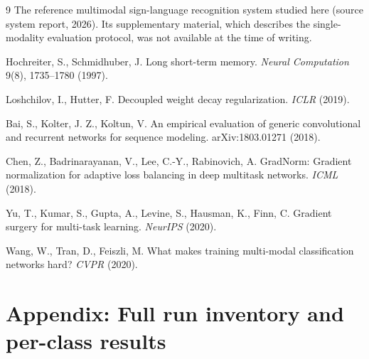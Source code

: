 \documentclass[11pt,a4paper]{article}
\begin{document}
\begin{thebibliography}{9}
\small
{} The reference multimodal sign-language recognition system studied here (source system report, 2026). Its supplementary material, which describes the single-modality evaluation protocol, was not available at the time of writing.

 Hochreiter, S., Schmidhuber, J. Long short-term memory. \emph{Neural Computation} 9(8), 1735--1780 (1997).

 Loshchilov, I., Hutter, F. Decoupled weight decay regularization. \emph{ICLR} (2019).

 Bai, S., Kolter, J. Z., Koltun, V. An empirical evaluation of generic convolutional and recurrent networks for sequence modeling. arXiv:1803.01271 (2018).

 Chen, Z., Badrinarayanan, V., Lee, C.-Y., Rabinovich, A. GradNorm: Gradient normalization for adaptive loss balancing in deep multitask networks. \emph{ICML} (2018).

 Yu, T., Kumar, S., Gupta, A., Levine, S., Hausman, K., Finn, C. Gradient surgery for multi-task learning. \emph{NeurIPS} (2020).

 Wang, W., Tran, D., Feiszli, M. What makes training multi-modal classification networks hard? \emph{CVPR} (2020).
\end{thebibliography}

\appendix
\section{Appendix: Full run inventory and per-class results}
\end{document}
